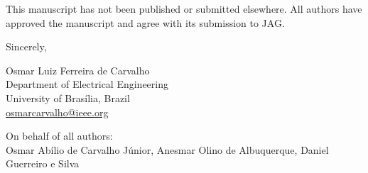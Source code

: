 \documentclass[11pt]{article}
\begin{document}
This manuscript has not been published or submitted elsewhere. All authors have approved the manuscript and agree with its submission to JAG.

\vspace{1cm}
\noindent Sincerely,

\vspace{0.8cm}
\noindent Osmar Luiz Ferreira de Carvalho\\
Department of Electrical Engineering\\
University of Bras\'{i}lia, Brazil\\
\href{mailto:osmarcarvalho@ieee.org}{osmarcarvalho@ieee.org}

\vspace{0.3cm}
\noindent On behalf of all authors:\\
Osmar Ab\'{i}lio de Carvalho J\'{u}nior, Anesmar Olino de Albuquerque, Daniel Guerreiro e Silva
\end{document}
